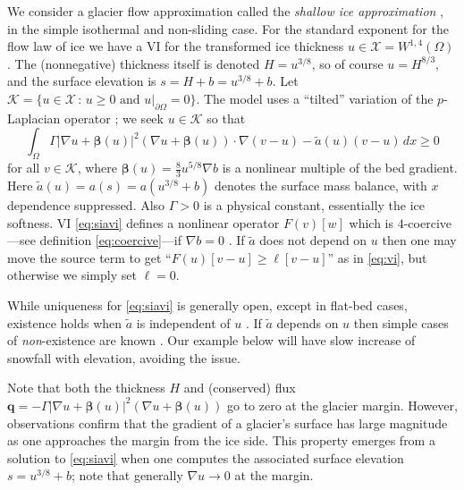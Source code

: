 \documentclass[]{interact}
\theoremstyle{plain}%
\theoremstyle{definition}
\theoremstyle{remark}
\newcommand{\grad}{\nabla}
\newcommand{\bq}{\mathbf{q}}
\newcommand{\cK}{\mathcal{K}}
\newcommand{\cX}{\mathcal{X}}
\begin{document}
We consider a glacier flow approximation called the \emph{shallow ice approximation} \cite{GreveBlatter2009}, in the simple isothermal and non-sliding case.   For the standard exponent for the flow law of ice \cite{GreveBlatter2009} we have a VI for the transformed ice thickness $u\in \cX = W^{1,4}(\Omega)$.  The (nonnegative) thickness itself is denoted $H=u^{3/8}$, so of course $u=H^{8/3}$, and the surface elevation is $s=H+b=u^{3/8}+b$.  Let $\cK = \{u \in \cX\,:\,u\ge 0 \text{ and } u|_{\partial\Omega}=0\}$.  The model uses a ``tilted'' variation of the $p$-Laplacian operator \cite{JouvetBueler2012}; we seek $u\in\cK$ so that
\begin{equation}
\int_\Omega \Gamma |\grad u + \bm{\beta}(u)|^2 (\grad u + \bm{\beta}(u)) \cdot \grad (v-u) - \tilde a(u) (v-u)\,dx \ge 0 \label{eq:siavi}
\end{equation}
for all $v \in \cK$, where $\bm{\beta}(u)=\frac{8}{3} u^{5/8} \grad b$ is a nonlinear multiple of the bed gradient.  Here $\tilde a(u)=a(s)=a(u^{3/8}+b)$ denotes the surface mass balance, with $x$ dependence suppressed.  Also $\Gamma>0$ is a physical constant, essentially the ice softness.  VI \eqref{eq:siavi} defines a nonlinear operator $F(v)[w]$ which is $4$-coercive---see definition \eqref{eq:coercive}---if $\grad b=0$ \cite{JouvetBueler2012}.  If $\tilde a$ does not depend on $u$ then one may move the source term to get ``$F(u)[v-u]\ge\ell[v-u]$'' as in \eqref{eq:vi}, but otherwise we simply set $\ell=0$.

While uniqueness for \eqref{eq:siavi} is generally open, except in flat-bed cases, existence holds when $\tilde a$ is independent of $u$ \cite{JouvetBueler2012}.  If $\tilde a$ depends on $u$ then simple cases of \emph{non}-existence are known \cite{Jouvetetal2011}.  Our example below will have slow increase of snowfall with elevation, avoiding the issue.

Note that both the thickness $H$ and (conserved) flux $\bq = - \Gamma |\grad u + \bm{\beta}(u)|^2 (\grad u + \bm{\beta}(u))$ go to zero at the glacier margin.  However, observations confirm that the gradient of a glacier's surface has large magnitude as one approaches the margin from the ice side.  This property emerges from a solution to \eqref{eq:siavi} when one computes the associated surface elevation $s=u^{3/8} + b$; note that generally $\grad u\to 0$ at the margin.
\end{document}
